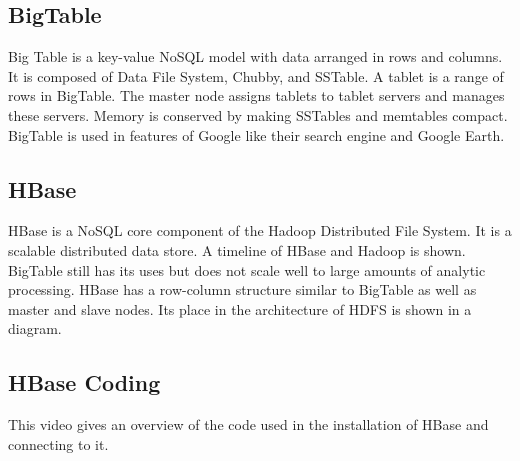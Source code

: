 \subsection{BigTable}

Big Table is a key-value NoSQL model with data arranged in rows and
columns. It is composed of Data File System, Chubby, and SSTable. A
tablet is a range of rows in BigTable. The master node assigns tablets
to tablet servers and manages these servers. Memory is conserved by
making SSTables and memtables compact. BigTable is used in features of
Google like their search engine and Google Earth.




\subsection{HBase}

HBase is a NoSQL core component of the Hadoop Distributed File System.
It is a scalable distributed data store. A timeline of HBase and Hadoop
is shown. BigTable still has its uses but does not scale well to large
amounts of analytic processing. HBase has a row-column structure similar
to BigTable as well as master and slave nodes. Its place in the
architecture of HDFS is shown in a diagram.




\subsection{HBase Coding}

This video gives an overview of the code used in the installation of
HBase and connecting to it.



